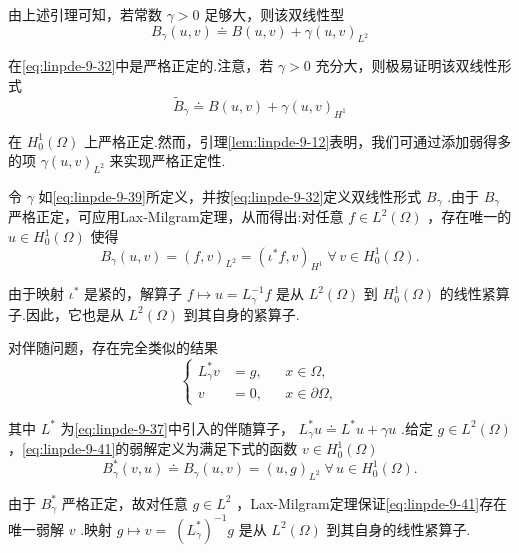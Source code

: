 \begin{remark}\label{rem:linpde-9-13}
由上述引理可知，若常数 $\gamma  > 0$ 足够大，则该双线性型
\[
{B}_{\gamma }\left(  {u,v}\right)   \doteq  B\left(  {u,v}\right)   + \gamma {\left( u,v\right) }_{{L}^{2}}
\]

在\eqref{eq:linpde-9-32}中是严格正定的.注意，若 $\gamma  > 0$ 充分大，则极易证明该双线性形式
\[
{\widetilde{B}}_{\gamma } \doteq  B\left(  {u,v}\right)   + \gamma {\left( u,v\right) }_{{H}^{1}}
\]

在 ${H}_{0}^{1}\left( \Omega \right)$ 上严格正定.然而，引理\ref{lem:linpde-9-12}表明，我们可通过添加弱得多的项 $\gamma {\left( u,v\right) }_{{L}^{2}}$ 来实现严格正定性.

令 $\gamma$ 如\eqref{eq:linpde-9-39}所定义，并按\eqref{eq:linpde-9-32}定义双线性形式 ${B}_{\gamma }$ .由于 ${B}_{\gamma }$ 严格正定，可应用Lax-Milgram定理，从而得出:对任意 $f \in  {L}^{2}\left( \Omega \right)$ ，存在唯一的 $u \in  {H}_{0}^{1}\left( \Omega \right)$ 使得
\begin{equation}\tag{9.40}\label{eq:linpde-9-40}
{B}_{\gamma }\left(  {u,v}\right)   = {\left( f,v\right) }_{{L}^{2}} = {\left( {\iota }^{ * }f,v\right) }_{{H}^{1}}\;\forall\,v \in  {H}_{0}^{1}\left( \Omega \right) .
\end{equation}

由于映射 ${\iota }^{ * }$ 是紧的，解算子 $f \mapsto  u = {L}_{\gamma }^{-1}f$ 是从 ${L}^{2}\left( \Omega \right)$ 到 ${H}_{0}^{1}\left( \Omega \right)$ 的线性紧算子.因此，它也是从 ${L}^{2}\left( \Omega \right)$ 到其自身的紧算子.

对伴随问题，存在完全类似的结果
\begin{equation}\tag{9.41}\label{eq:linpde-9-41}
\left\{  \begin{aligned} {L}_{\gamma }^{ * }v &  = g, & & x \in  \Omega , \\  v &  = 0, & & x \in  \partial \Omega , \end{aligned}\right.
\end{equation}

其中 ${L}^{ * }$ 为\eqref{eq:linpde-9-37}中引入的伴随算子， ${L}_{\gamma }^{ * }u \doteq  {L}^{ * }u + {\gamma u}$ .给定 $g \in  {L}^{2}\left( \Omega \right)$ ，\eqref{eq:linpde-9-41}的弱解定义为满足下式的函数 $v \in  {H}_{0}^{1}\left( \Omega \right)$
\begin{equation}\tag{9.42}\label{eq:linpde-9-42}
{B}_{\gamma }^{ * }\left(  {v,u}\right)   \doteq  {B}_{\gamma }\left(  {u,v}\right)   = {\left( u,g\right) }_{{L}^{2}}\;\forall\,u \in  {H}_{0}^{1}\left( \Omega \right) .
\end{equation}

由于 ${B}_{\gamma }^{ * }$ 严格正定，故对任意 $g \in  {L}^{2}$ ，Lax-Milgram定理保证\eqref{eq:linpde-9-41}存在唯一弱解 $v$ .映射 $g \mapsto  v = \; {\left( {L}_{\gamma }^{ * }\right) }^{-1}g$ 是从 ${L}^{2}\left( \Omega \right)$ 到其自身的线性紧算子.
\end{remark}


